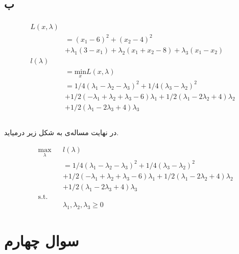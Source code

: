 \documentclass[paper=a4, fontsize=11pt]{article}
\numberwithin{equation}{section} %
\numberwithin{figure}{section} %
\numberwithin{table}{section} %
\begin{document}
\subsection{ب}
\begin{align}
	\begin{split}
		L(x, \lambda)\\
		&= (x_1 - 6)^2 + (x_2 - 4)^2\\
		&+ \lambda_1 (3 - x_1) + \lambda_2 (x_1 + x_2 - 8) + \lambda_3 (x_1 - x_2)\\
		l(\lambda)\\
		&= \underset{x}{\text{min}}L(x, \lambda)\\
		&= 1/4(\lambda_1-\lambda_2-\lambda_3)^2 + 1/4(\lambda_3-\lambda_2)^2 \\
		&+ 1/2(-\lambda_1+\lambda_2+\lambda_3-6)\lambda_1 + 1/2(\lambda_1-2\lambda_2+4)\lambda_2 \\
		&+ 1/2(\lambda_1-2\lambda_3+4)\lambda_3 \\
	\end{split}
\end{align}
\paragraph{}
در نهایت مساله‌ی  به شکل زیر درمیاید.

\begin{equation}
	\begin{aligned}
		& \underset{\lambda}{\text{max}}
		& & l(\lambda) \\
		& & &= 1/4(\lambda_1-\lambda_2-\lambda_3)^2 + 1/4(\lambda_3-\lambda_2)^2 \\
		& & &+ 1/2(-\lambda_1+\lambda_2+\lambda_3-6)\lambda_1 + 1/2(\lambda_1-2\lambda_2+4)\lambda_2 \\
		& & &+ 1/2(\lambda_1-2\lambda_3+4)\lambda_3 \\
		& \text{s.t.} \\
		& & & \lambda_1, \lambda_2, \lambda_3 \ge 0
	\end{aligned}
\end{equation}

\section{سوال چهارم}
\end{document}
